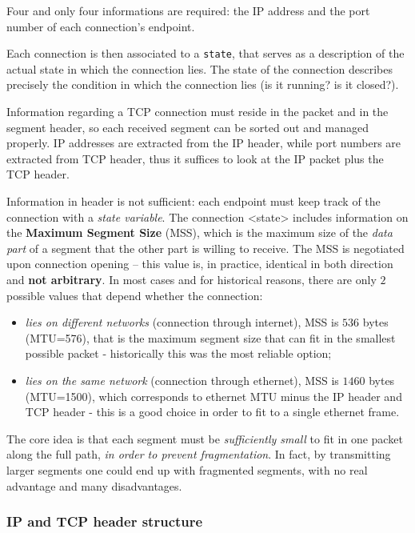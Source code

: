 \documentclass[10pt]{\classname}
\begin{document}
Four and only four informations are required: the IP address and the
port number of each connection's endpoint.

Each connection is then associated to a \texttt{state}, that serves as a
description of the actual state in which the connection lies. The state of the
connection describes precisely the condition in which the connection lies (is
it running? is it closed?).

Information regarding a TCP connection must reside in the packet and in the segment
header, so each received segment can be sorted out and managed properly. IP
addresses are extracted from the IP header, while port numbers are extracted
from TCP header, thus it suffices to look at the IP packet plus the TCP header.

Information in header is not sufficient: each endpoint must keep track of the
connection with a \emph{state variable}. The connection <state> includes
information on the \textbf{Maximum Segment Size} (MSS), which is the maximum
size of the \emph{data part} of a segment that the other part is willing to
receive. The MSS is negotiated upon connection opening \--- this value is, in
practice, identical in both direction and \textbf{not arbitrary}. In most
cases and for historical reasons, there are only $2$ possible values that
depend whether the connection:

\begin{itemize}
    \item \emph{lies on different networks} (connection through internet), MSS
        is $536$ bytes (MTU=576), that is the maximum segment size that can fit
        in the smallest possible packet \-- historically this was the most
        reliable option;
    \item \emph{lies on the same network} (connection through ethernet), MSS is
        $1460$ bytes (MTU=1500), which corresponds to ethernet MTU minus the IP
        header and TCP header \-- this is a good choice in order to fit to a
        single ethernet frame.
\end{itemize}

The core idea is that each segment must be \emph{sufficiently small} to fit in
one packet along the full path, \emph{in order to prevent fragmentation}. In
fact, by transmitting larger segments one could end up with fragmented
segments, with no real advantage and many disadvantages.

\subsubsection{IP and TCP header structure}
\end{document}
